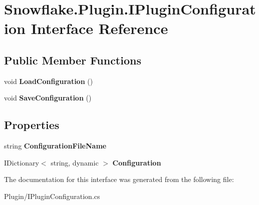 \hypertarget{interface_snowflake_1_1_plugin_1_1_i_plugin_configuration}{}\section{Snowflake.\+Plugin.\+I\+Plugin\+Configuration Interface Reference}
\label{interface_snowflake_1_1_plugin_1_1_i_plugin_configuration}
\subsection*{Public Member Functions}
\begin{DoxyCompactItemize}
\item 
\hypertarget{interface_snowflake_1_1_plugin_1_1_i_plugin_configuration_a41c815380eabd81bae7e678da5b04884}{}void {\bfseries Load\+Configuration} ()\label{interface_snowflake_1_1_plugin_1_1_i_plugin_configuration_a41c815380eabd81bae7e678da5b04884}

\item 
\hypertarget{interface_snowflake_1_1_plugin_1_1_i_plugin_configuration_a22f475e74370ce7c609a9c8ce6c3a9dd}{}void {\bfseries Save\+Configuration} ()\label{interface_snowflake_1_1_plugin_1_1_i_plugin_configuration_a22f475e74370ce7c609a9c8ce6c3a9dd}

\end{DoxyCompactItemize}
\subsection*{Properties}
\begin{DoxyCompactItemize}
\item 
\hypertarget{interface_snowflake_1_1_plugin_1_1_i_plugin_configuration_a7f457d870f0808d2ef41866df200e008}{}string {\bfseries Configuration\+File\+Name}\label{interface_snowflake_1_1_plugin_1_1_i_plugin_configuration_a7f457d870f0808d2ef41866df200e008}

\item 
\hypertarget{interface_snowflake_1_1_plugin_1_1_i_plugin_configuration_a7cfa77237b6d1785e8f8b1a0eed3ddf8}{}I\+Dictionary$<$ string, dynamic $>$ {\bfseries Configuration}\label{interface_snowflake_1_1_plugin_1_1_i_plugin_configuration_a7cfa77237b6d1785e8f8b1a0eed3ddf8}

\end{DoxyCompactItemize}


The documentation for this interface was generated from the following file\+:\begin{DoxyCompactItemize}
\item 
Plugin/I\+Plugin\+Configuration.\+cs\end{DoxyCompactItemize}
